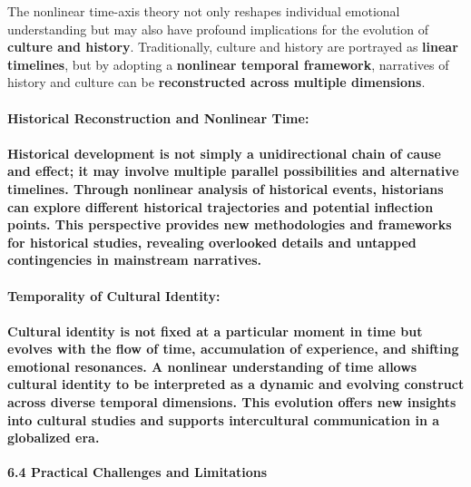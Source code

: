 \documentclass[a4paper]{article}
\begin{document}
The nonlinear time-axis theory not only reshapes individual emotional understanding but may also have profound
implications for the evolution of \textbf{culture and history}. Traditionally, culture and history are portrayed as
\textbf{linear timelines}, but by adopting a \textbf{nonlinear temporal framework}, narratives of history and culture
can be \textbf{reconstructed across multiple dimensions}.

\paragraph[Historical Reconstruction and Nonlinear Time:]{\textbf{Historical Reconstruction and Nonlinear Time:}}
\paragraph[Historical development is not simply a unidirectional chain of cause and effect; it may involve multiple
parallel possibilities and alternative timelines. Through nonlinear analysis of historical events, historians can
explore different historical trajectories and potential inflection points. This perspective provides new methodologies
and frameworks for historical studies, revealing overlooked details and untapped contingencies in mainstream
narratives.]{Historical development is not simply a unidirectional chain of cause and effect; it may involve
\textbf{multiple parallel possibilities} and \textbf{alternative timelines}. Through nonlinear analysis of historical
events, historians can explore \textbf{different historical trajectories} and \textbf{potential inflection points}.
This perspective provides \textbf{new methodologies and frameworks} for historical studies, revealing overlooked
details and untapped contingencies in mainstream narratives.}
\paragraph[Temporality of Cultural Identity:]{\textbf{Temporality of Cultural Identity:}}
\paragraph[Cultural identity is not fixed at a particular moment in time but evolves with the flow of time, accumulation
of experience, and shifting emotional resonances. A nonlinear understanding of time allows cultural identity to be
interpreted as a dynamic and evolving construct across diverse temporal dimensions. This evolution offers new insights
into cultural studies and supports intercultural communication in a globalized era.]{Cultural identity is not fixed at
a particular moment in time but evolves with the \textbf{flow of time}, \textbf{accumulation of experience}, and
\textbf{shifting emotional resonances}. A nonlinear understanding of time allows cultural identity to be interpreted as
a \textbf{dynamic and evolving construct} across diverse temporal dimensions. This evolution offers \textbf{new
insights into cultural studies} and supports \textbf{intercultural communication} in a globalized era.}
\textbf{6.4 Practical Challenges and Limitations}
\end{document}
